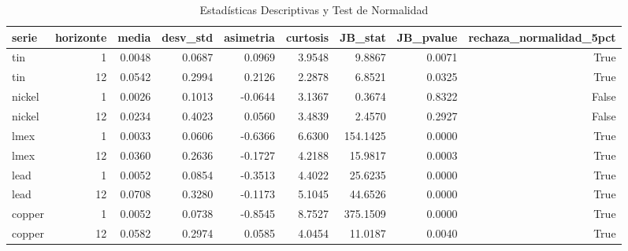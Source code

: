 \begin{table}
\caption{Estadísticas Descriptivas y Test de Normalidad}
\label{tab:normalidad}
\begin{tabular}{lrrrrrrrr}
\toprule
serie & horizonte & media & desv_std & asimetria & curtosis & JB_stat & JB_pvalue & rechaza_normalidad_5pct \\
\midrule
tin & 1 & 0.0048 & 0.0687 & 0.0969 & 3.9548 & 9.8867 & 0.0071 & True \\
tin & 12 & 0.0542 & 0.2994 & 0.2126 & 2.2878 & 6.8521 & 0.0325 & True \\
nickel & 1 & 0.0026 & 0.1013 & -0.0644 & 3.1367 & 0.3674 & 0.8322 & False \\
nickel & 12 & 0.0234 & 0.4023 & 0.0560 & 3.4839 & 2.4570 & 0.2927 & False \\
lmex & 1 & 0.0033 & 0.0606 & -0.6366 & 6.6300 & 154.1425 & 0.0000 & True \\
lmex & 12 & 0.0360 & 0.2636 & -0.1727 & 4.2188 & 15.9817 & 0.0003 & True \\
lead & 1 & 0.0052 & 0.0854 & -0.3513 & 4.4022 & 25.6235 & 0.0000 & True \\
lead & 12 & 0.0708 & 0.3280 & -0.1173 & 5.1045 & 44.6526 & 0.0000 & True \\
copper & 1 & 0.0052 & 0.0738 & -0.8545 & 8.7527 & 375.1509 & 0.0000 & True \\
copper & 12 & 0.0582 & 0.2974 & 0.0585 & 4.0454 & 11.0187 & 0.0040 & True \\
\bottomrule
\end{tabular}
\end{table}
